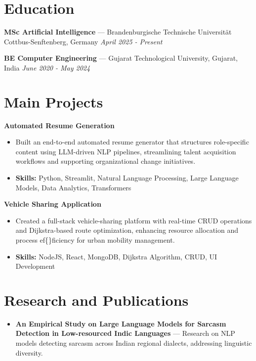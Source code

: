 \documentclass[a4paper,10pt]{article}
\begin{document}
\section*{Education}
\textbf{MSc Artificial Intelligence} — Brandenburgische Technische Universität Cottbus-Senftenberg, Germany \hfill \textit{April 2025 - Present}\par
\vspace{1.5pt}
\textbf{BE Computer Engineering} — Gujarat Technological University, Gujarat, India \hfill \textit{June 2020 - May 2024}\par

\section*{Main Projects}
\textbf{Automated Resume Generation}\par
\vspace{1pt}
\begin{itemize}
  \item Built an end-to-end automated resume generator that structures role-specific content using LLM-driven NLP pipelines, streamlining talent acquisition workflows and supporting organizational change initiatives.
  \item \textbf{Skills:} Python, Streamlit, Natural Language Processing, Large Language Models, Data Analytics, Transformers
\end{itemize}
\vspace{3pt}
\textbf{Vehicle Sharing Application}\par
\vspace{1pt}
\begin{itemize}
  \item Created a full-stack vehicle-sharing platform with real-time CRUD operations and Dijkstra-based route optimization, enhancing resource allocation and process ef\{\}ficiency for urban mobility management.
  \item \textbf{Skills:} NodeJS, React, MongoDB, Dijkstra Algorithm, CRUD, UI Development
\end{itemize}

\section*{Research and Publications}
\begin{itemize}
\item \textbf{An Empirical Study on Large Language Models for Sarcasm Detection in Low-resourced Indic Languages} — Research on NLP models detecting sarcasm across Indian regional dialects, addressing linguistic diversity.
\end{itemize}
\end{document}
